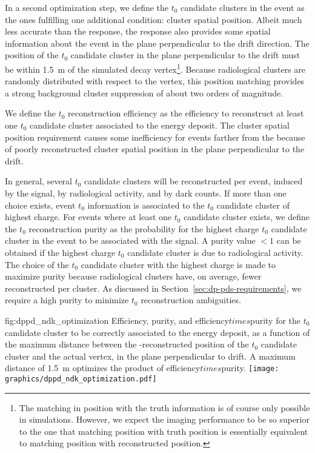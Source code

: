 In a second optimization step, we define the $t_0$ candidate clusters in the event as the ones fulfilling one additional condition: cluster spatial position. Albeit much less accurate than the  response, the  response also provides some spatial information about the event in the plane perpendicular to the drift direction. The position of the $t_0$ candidate cluster in the plane perpendicular to the drift must be within \SI{1.5}{\m} of the simulated  decay vertex\footnote{The matching in position with the  truth information is of course only possible in simulations. However, we expect the  imaging performance to be so superior to the  
one that matching  position with  truth position is essentially equivalent to matching  position with  reconstructed position.}. Because radiological clusters are randomly distributed with respect to the  vertex, this position matching provides a strong background cluster suppression of about two orders of magnitude.

We define the  $t_0$ reconstruction efficiency as the efficiency to reconstruct at least one $t_0$ candidate cluster associated to the  energy deposit. The cluster spatial position requirement causes some inefficiency for events farther from the  because of poorly reconstructed cluster spatial position in the plane perpendicular to the drift.

In general, several $t_0$ candidate clusters will be reconstructed per event, induced by the  signal, by radiological activity, and by  dark counts. If more than one choice exists, event $t_0$ information is associated to the $t_0$ candidate cluster of highest charge. For events where at least one $t_0$ candidate cluster exists, we define the   $t_0$ reconstruction purity as the probability for the highest charge $t_0$ candidate cluster in the event to be associated with the  signal. A purity value $<1$ can be obtained if the highest charge $t_0$ candidate cluster is due to radiological activity. The choice of the $t_0$ candidate cluster with the highest charge is made to maximize purity because radiological clusters have, on average, fewer reconstructed  per cluster. As discussed in Section~\ref{sec:dp-pds-requirements}, we require a high purity to minimize $t_0$ reconstruction ambiguities.
%

\begin{dunefigure}{fig:dppd_ndk_optimization}
{Efficiency, purity, and efficiency$times$purity for the $t_0$ candidate cluster to be correctly associated to the  energy deposit, as a function of the maximum \twod distance between the -reconstructed position of the $t_0$ candidate cluster and the actual  vertex, in the plane perpendicular to drift. A maximum distance of \SI{1.5}{\m} optimizes the product of efficiency$times$purity.}
\texttt{[image: graphics/dppd\_ndk\_optimization.pdf]}
\end{dunefigure}

